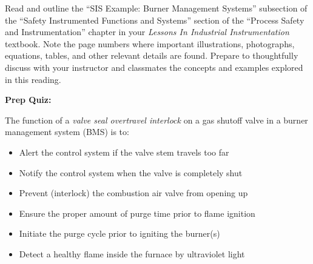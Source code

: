 

Read and outline the ``SIS Example: Burner Management Systems'' subsection of the ``Safety Instrumented Functions and Systems'' section of the ``Process Safety and Instrumentation'' chapter in your {\it Lessons In Industrial Instrumentation} textbook.  Note the page numbers where important illustrations, photographs, equations, tables, and other relevant details are found.  Prepare to thoughtfully discuss with your instructor and classmates the concepts and examples explored in this reading.













\vfil \eject

\noindent
{\bf Prep Quiz:}

The function of a {\it valve seal overtravel interlock} on a gas shutoff valve in a burner management system (BMS) is to:

\begin{itemize}
\item{} Alert the control system if the valve stem travels too far
\vskip 5pt 
\item{} Notify the control system when the valve is completely shut 
\vskip 5pt 
\item{} Prevent (interlock) the combustion air valve from opening up
\vskip 5pt 
\item{} Ensure the proper amount of purge time prior to flame ignition
\vskip 5pt 
\item{} Initiate the purge cycle prior to igniting the burner(s)
\vskip 5pt 
\item{} Detect a healthy flame inside the furnace by ultraviolet light
\end{itemize}




